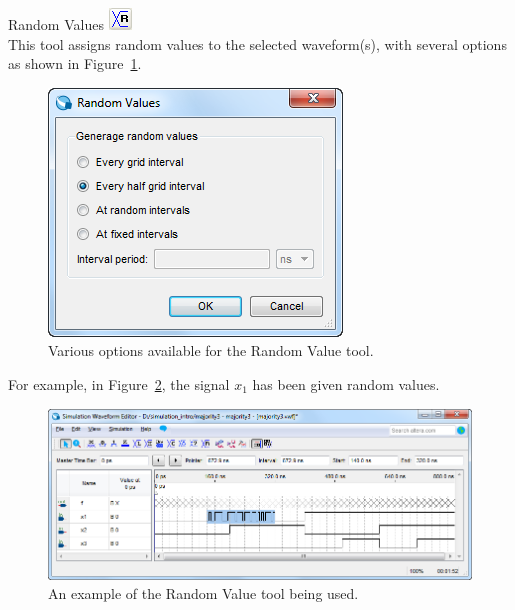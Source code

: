 \documentclass[11pt, twoside, pdftex]{article}
\begin{document}
\begin{description}
	\item {\sf Random Values} \hbox{\includegraphics[scale=0.7]{figures/appendix/icon13.png}}\\
	This tool assigns random values to the selected waveform(s), with several options as 
	shown in Figure~\ref{fig:fig16}.
	\begin{figure}[H]
	   \begin{center}
	      \includegraphics[scale=0.65]{figures/appendix/figure16.png}
	   \caption{Various options available for the Random Value tool.} 
		 \label{fig:fig16}
		 \end{center}
	\end{figure}
	
	For example, in Figure~\ref{fig:fig17}, the signal $x_1$ has been given random values.
	\begin{figure}[H]
	   \begin{center}
	      \includegraphics[scale=0.65]{figures/appendix/figure17.png}
	   \caption{An example of the {\sf Random Value} tool being used.} 
		 \label{fig:fig17}
		 \end{center}
	\end{figure}


\end{description}
\end{document}
